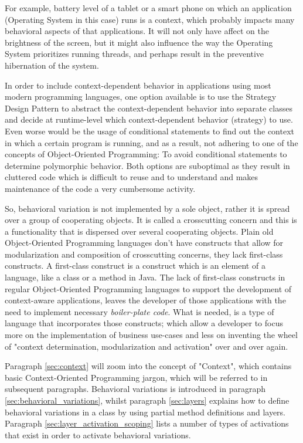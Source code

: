 \documentclass{acm_proc_article-sp}
\begin{document}
For example, battery level of a tablet or a smart phone on which an application (Operating System in this case) runs is a context, which probably impacts many behavioral aspects of that applications. It will not only have affect on the brightness of the screen, but it might also influence the way the Operating System prioritizes running threads, and perhaps result in the preventive hibernation of the system.

In order to include context-dependent behavior in applications using most modern programming languages, one option available is to use the Strategy Design Pattern \cite{Costanza:2005:LCC:1146841.1146842,strategypattern} to abstract the context-dependent behavior into separate classes and decide at runtime-level which context-dependent behavior (strategy) to use. Even worse would be the usage of conditional statements to find out the context in which a certain program is running, and as a result, not adhering to one of the concepts of Object-Oriented Programming: To avoid conditional statements to determine polymorphic behavior. Both options are suboptimal as they result in cluttered code which is difficult to reuse and to understand and makes maintenance of the code a very cumbersome activity.

So, behavioral variation is not implemented by a sole object, rather it is spread over a group of cooperating objects. It is called a crosscutting concern \cite{kiczalesetallaop} and this is a functionality that is dispersed over several cooperating objects. Plain old Object-Oriented Programming languages don't have constructs that allow for modularization and composition of crosscutting concerns, they lack first-class constructs. A first-class construct \cite{Keays:2003:CP:940923.940926} is a construct which is an element of a language, like a class or a method in Java. The lack of first-class constructs in regular Object-Oriented Programming languages to support the development of context-aware applications, leaves the developer of those applications with the need to implement necessary \textit{boiler-plate code}. What is needed, is a type of language that incorporates those constructs; which allow a developer to focus more on the implementation of business use-cases and less on inventing the wheel of "context determination, modularization and activation" over and over again. 

Paragraph \ref{sec:context} will zoom into the concept of "Context", which contains basic Context-Oriented Programming jargon, which will be referred to in subsequent paragraphs. Behavioral variations is introduced in paragraph \ref{sec:behavioral_variations}, whilst paragraph \ref{sec:layers} explains how to define behavioral variations in a class by using partial method definitions and layers. Paragraph \ref{sec:layer_activation_scoping} lists a number of types of activations that exist in order to activate behavioral variations. 
\end{document}
